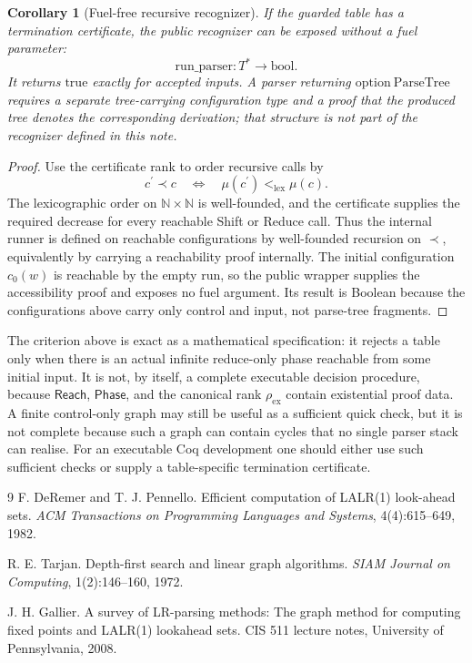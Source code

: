 \documentclass[11pt,a4paper]{article}
\theoremstyle{prettyplain}
\newtheorem{corollary}[theorem]{Corollary}
\theoremstyle{prettydef}
\begin{document}
\begin{corollary}[Fuel-free recursive recognizer]\label{cor:fuel-free-parser}
If the guarded table has a termination certificate, the public recognizer can be
exposed without a fuel parameter:
\[
\mathrm{run\_parser}:T^*\to\mathrm{bool}.
\]
It returns \(\mathrm{true}\) exactly for accepted inputs.  A parser returning
\(\mathrm{option}\ \mathrm{ParseTree}\) requires a separate tree-carrying
configuration type and a proof that the produced tree denotes the corresponding
derivation; that structure is not part of the recognizer defined in this note.
\end{corollary}

\begin{proof}
Use the certificate rank to order recursive calls by
\[
c^\prime\prec c
\quad\Longleftrightarrow\quad
\mu(c^\prime)<_{\mathrm{lex}}\mu(c).
\]
The lexicographic order on \(\mathbb N\times\mathbb N\) is well-founded, and the
certificate supplies the required decrease for every reachable Shift or Reduce
call.  Thus the internal runner is defined on reachable configurations by
well-founded recursion on \(\prec\), equivalently by carrying a reachability
proof internally.  The initial configuration \(c_0(w)\) is reachable by the empty
run, so the public wrapper supplies the accessibility proof and exposes no fuel
argument.  Its result is Boolean because the configurations above carry only
control and input, not parse-tree fragments.
\end{proof}

The criterion above is exact as a mathematical specification: it rejects a table
only when there is an actual infinite reduce-only phase reachable from some
initial input.  It is not, by itself, a complete executable decision procedure,
because \(\mathsf{Reach}\), \(\mathsf{Phase}\), and the canonical rank
\(\rho_{\mathrm{ex}}\) contain existential proof data.  A finite control-only graph
may still be useful as a sufficient quick check, but it is not complete because
such a graph can contain cycles that no single parser stack can realise.  For an
executable Coq development one should either use such sufficient checks or supply
a table-specific termination certificate.


\begin{thebibliography}{9}
F. DeRemer and T. J. Pennello.
\newblock Efficient computation of LALR(1) look-ahead sets.
\newblock \emph{ACM Transactions on Programming Languages and Systems},
4(4):615--649, 1982.

R. E. Tarjan.
\newblock Depth-first search and linear graph algorithms.
\newblock \emph{SIAM Journal on Computing}, 1(2):146--160, 1972.

J. H. Gallier.
\newblock A survey of LR-parsing methods: The graph method for computing fixed
points and LALR(1) lookahead sets.
\newblock CIS 511 lecture notes, University of Pennsylvania, 2008.
\end{thebibliography}
\end{document}
